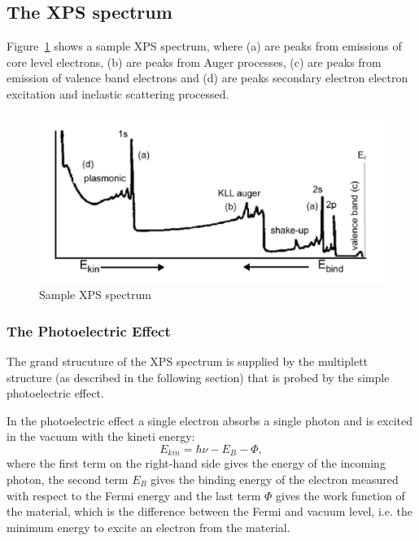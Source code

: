 \documentclass[a4paper,10pt]{scrartcl}
\begin{document}
\subsection{The XPS spectrum}

Figure~\ref{fig:spectrum} shows a sample XPS spectrum, where (a) are peaks from emissions of core level electrons, (b) are peaks from Auger processes, (c) are peaks from emission of valence band electrons and (d) are peaks secondary electron electron excitation and inelastic scattering processed.

\begin{figure}
\centering
\includegraphics[scale=0.4]{img/spectrum}
\caption{Sample XPS spectrum \label{fig:spectrum}}
\end{figure}

\subsubsection{The Photoelectric Effect}

The grand strucuture of the XPS spectrum is supplied by the multiplett structure (as described in the following section) that is probed by the simple photoelectric effect.

In the photoelectric effect a single electron absorbs a single photon and is excited in the vacuum with the kineti energy:
\begin{equation}
E_{kin} = \hbar \nu - E_{B} - \Phi,
\end{equation}
where the first term on the right-hand side gives the energy of the incoming photon, the second term $E_{B}$ gives the binding energy of the electron measured with respect to the Fermi energy and the last term $\Phi$ gives the work function of the material, which is the difference between the Fermi and vacuum level, i.e. the minimum energy to excite an electron from the material.
\end{document}
